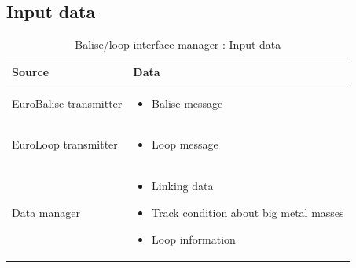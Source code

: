 \documentclass[nocc]{template/openetcs_report}
\begin{document}
\subsection{Input data}
			\begin{longtable}{|l|l|}
				\caption{Balise/loop interface manager : Input data}\\ 
				\hline
				
					\begin{minipage}[t]{0.35\linewidth} \textbf{Source}	\end{minipage} 
				&	\begin{minipage}[t]{0.65\linewidth} \textbf{Data} \end{minipage} \\
				
				\hline
																																									
					\begin{minipage}[t]{0.35\linewidth} EuroBalise transmitter	\end{minipage} 
				&	\begin{minipage}[t]{0.65\linewidth}
						\begin{itemize}
							\item Balise message
						\end{itemize}
					\end{minipage} \\
				
				\hline
				
					\begin{minipage}[t]{0.35\linewidth} EuroLoop transmitter	\end{minipage} 
				&	\begin{minipage}[t]{0.65\linewidth}
						\begin{itemize}
							\item Loop message
						\end{itemize}
					\end{minipage} \\
				
				\hline		
						
					\begin{minipage}[t]{0.35\linewidth} Data manager	\end{minipage} 
				&	\begin{minipage}[t]{0.65\linewidth}
						\begin{itemize}
							\item Linking data
							\item Track condition about big metal masses
							\item Loop information
						\end{itemize}
					\end{minipage} \\
				

\end{longtable}
\end{document}
